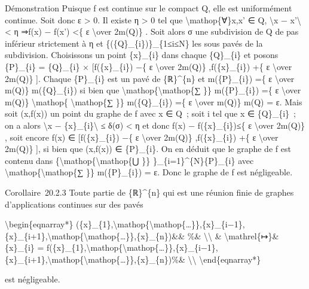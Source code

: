 \documentclass[]{article}
\begin{document}
Démonstration Puisque f est continue sur le compact Q, elle est
uniformément continue. Soit donc ε \textgreater{} 0. Il existe η
\textgreater{} 0 tel que \textbackslash{}mathop\{∀\}x,x' ∈ Q,
\textbackslash{}\textbar{}x − x'\textbackslash{}\textbar{} \textless{} η
⇒\textbar{}f(x) − f(x')\textbar{} \textless{}\{ ε \textbackslash{}over
2m(Q)\} . Soit alors σ une subdivision de Q de pas inférieur strictement
à η et \{(\{Q\}\_\{i\})\}\_\{1≤i≤N\} les sous pavés de la subdivision.
Choisissons un point \{x\}\_\{i\} dans chaque \{Q\}\_\{i\} et posons
\{P\}\_\{i\} = \{Q\}\_\{i\} × {[}f(\{x\}\_\{i\}) −\{ ε
\textbackslash{}over 2m(Q)\} ,f(\{x\}\_\{i\}) +\{ ε \textbackslash{}over
2m(Q)\} {]}. Chaque \{P\}\_\{i\} est un pavé de \{ℝ\}\^{}\{n\} et
m(\{P\}\_\{i\}) =\{ ε \textbackslash{}over m(Q)\} m(\{Q\}\_\{i\}) si
bien que \textbackslash{}mathop\{\textbackslash{}mathop\{∑ \}\}
m(\{P\}\_\{i\}) =\{ ε \textbackslash{}over m(Q)\}
\textbackslash{}mathop\{ \textbackslash{}mathop\{∑ \}\} m(\{Q\}\_\{i\})
=\{ ε \textbackslash{}over m(Q)\} m(Q) = ε. Mais soit (x,f(x)) un point
du graphe de f avec x ∈ Q~; soit i tel que x ∈ \{Q\}\_\{i\}~; on a alors
\textbackslash{}\textbar{}x − \{x\}\_\{i\}\textbackslash{}\textbar{} ≤
δ(σ) \textless{} η et donc \textbar{}f(x) − f(\{x\}\_\{i\})\textbar{}≤\{
ε \textbackslash{}over 2m(Q)\} , soit encore f(x) ∈ {[}f(\{x\}\_\{i\})
−\{ ε \textbackslash{}over 2m(Q)\} ,f(\{x\}\_\{i\}) +\{ ε
\textbackslash{}over 2m(Q)\} {]}, si bien que (x,f(x)) ∈ \{P\}\_\{i\}.
On en déduit que le graphe de f est contenu dans
\{\textbackslash{}mathop\{\textbackslash{}mathop\{⋃ \}\}
\}\_\{i=1\}\^{}\{N\}\{P\}\_\{i\} avec
\textbackslash{}mathop\{\textbackslash{}mathop\{∑ \}\} m(\{P\}\_\{i\}) =
ε. Donc le graphe de f est négligeable.

Corollaire~20.2.3 Toute partie de \{ℝ\}\^{}\{n\} qui est une réunion
finie de graphes d'applications continues sur des pavés

\textbackslash{}begin\{eqnarray*\}
(\{x\}\_\{1\},\textbackslash{}mathop\{\textbackslash{}mathop\{\ldots{}\}\},\{x\}\_\{i−1\},\{x\}\_\{i+1\},\textbackslash{}mathop\{\textbackslash{}mathop\{\ldots{}\}\},\{x\}\_\{n\})\&\&
\%\& \textbackslash{}\textbackslash{} \& \textbackslash{}mathrel\{↦\}\&
\{x\}\_\{i\} =
f(\{x\}\_\{1\},\textbackslash{}mathop\{\textbackslash{}mathop\{\ldots{}\}\},\{x\}\_\{i−1\},\{x\}\_\{i+1\},\textbackslash{}mathop\{\textbackslash{}mathop\{\ldots{}\}\},\{x\}\_\{n\})\%\&
\textbackslash{}\textbackslash{} \textbackslash{}end\{eqnarray*\}

est négligeable.
\end{document}
